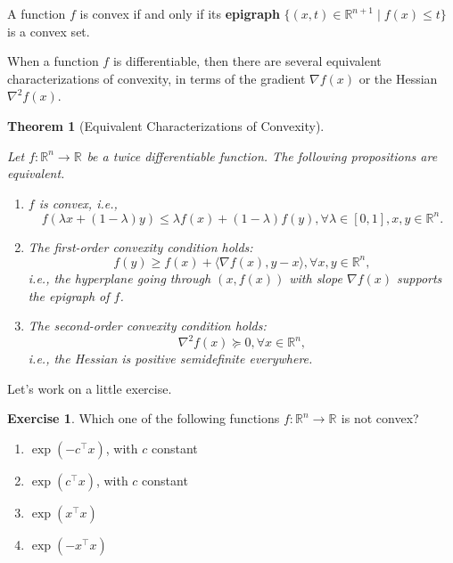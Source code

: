 \documentclass[
]{book}
\newtheorem{theorem}{Theorem}[chapter]
\theoremstyle{definition}
\theoremstyle{definition}
\theoremstyle{definition}
\newtheorem{exercise}{Exercise}[chapter]
\theoremstyle{definition}
\theoremstyle{remark}
\begin{document}
A function \(f\) is convex if and only if its \textbf{epigraph} \(\{ (x,t) \in \mathbb{R}^{n+1} \mid f(x) \leq t \}\) is a convex set.

When a function \(f\) is differentiable, then there are several equivalent characterizations of convexity, in terms of the gradient \(\nabla f(x)\) or the Hessian \(\nabla^2 f(x)\).

\begin{theorem}[Equivalent Characterizations of Convexity]
\protect\hypertarget{thm:CharacterizeConvexity}{}\label{thm:CharacterizeConvexity}

Let \(f: \mathbb{R}^{n} \rightarrow \mathbb{R}^{}\) be a twice differentiable function. The following propositions are equivalent.

\begin{enumerate}
\def\labelenumi{\roman{enumi}.}
\item
  \(f\) is convex, i.e.,
  \[
  f(\lambda x + (1-\lambda) y) \leq \lambda f(x) + (1-\lambda) f(y), \forall \lambda \in [0,1], x,y \in \mathbb{R}^{n}.
  \]
\item
  The first-order convexity condition holds:
  \[
  f(y) \geq f(x) + \langle \nabla f(x),  y - x \rangle, \forall x, y \in \mathbb{R}^{n},
  \]
  i.e., the hyperplane going through \((x,f(x))\) with slope \(\nabla f(x)\) supports the epigraph of \(f\).
\item
  The second-order convexity condition holds:
  \[
  \nabla^2 f(x) \succeq 0, \forall x \in \mathbb{R}^{n},
  \]
  i.e., the Hessian is positive semidefinite everywhere.
\end{enumerate}

\end{theorem}

Let's work on a little exercise.

\begin{exercise}

Which one of the following functions \(f: \mathbb{R}^{n} \rightarrow \mathbb{R}^{}\) is not convex?

\begin{enumerate}
\def\labelenumi{\alph{enumi}.}
\item
  \(\exp(-c^\top x)\), with \(c\) constant
\item
  \(\exp(c^\top x)\), with \(c\) constant
\item
  \(\exp(x^\top x)\)
\item
  \(\exp(-x^\top x)\)
\end{enumerate}

\end{exercise}
\end{document}
